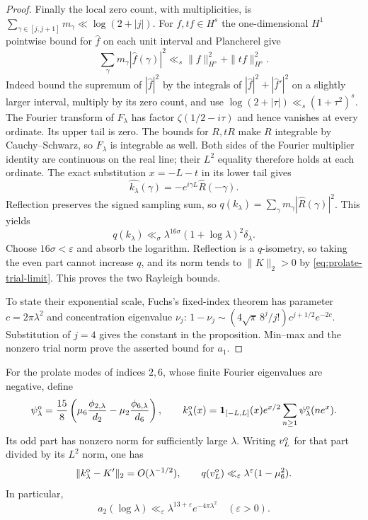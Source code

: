 \begin{proof}
Finally the local zero count, with multiplicities, is
$\sum_{\gamma\in[j,j+1]}m_\gamma\ll\log(2+|j|)$.
For $f,tf\in H^s$ the one-dimensional $H^1$ pointwise bound for
$\widehat f$ on each unit interval and Plancherel give
\[
 \sum_\gamma m_\gamma|\widehat f(\gamma)|^2
      \ll_s\|f\|_{H^s}^2+\|tf\|_{H^s}^2.
\]
Indeed bound the supremum of $|\widehat f|^2$ by the integrals of
$|\widehat f|^2+|\widehat f'|^2$ on a slightly larger interval,
multiply by its zero count, and use
$\log(2+|\tau|)\ll_s(1+\tau^2)^s$.
The Fourier transform of $F_\lambda$ has factor
$\zeta(1/2-i\tau)$ and hence vanishes at every ordinate. Its upper
tail is zero. The bounds for $R,tR$ make $R$ integrable by
Cauchy--Schwarz, so $F_\lambda$ is integrable as well. Both sides of
the Fourier multiplier identity are continuous on the real line;
their $L^2$ equality therefore holds at each ordinate.
The exact substitution $x=-L-t$ in its lower tail gives
\[
 \widehat{k_\lambda}(\gamma)
       =-e^{i\gamma L}\widehat R(-\gamma).
\]
Reflection preserves the signed sampling sum, so
$q(k_\lambda)=\sum_\gamma m_\gamma|\widehat R(\gamma)|^2$.
This yields
\[
 q(k_\lambda)\ll_\sigma
       \lambda^{16\sigma}(1+\log\lambda)^2\delta_\lambda.
\]
Choose $16\sigma<\varepsilon$ and absorb the logarithm.
Reflection is a $q$-isometry, so taking the even part cannot increase
$q$, and its norm tends to $\|K\|_2>0$ by
\eqref{eq:prolate-trial-limit}. This proves the two Rayleigh bounds.

To state their exponential scale, Fuchs's fixed-index theorem
\cite[Theorem~1, p.~319]{fuchs1964} has parameter $c=2\pi\lambda^2$
and concentration eigenvalue $\nu_j$:
$1-\nu_j\sim(4\sqrt\pi\,8^j/j!)c^{j+1/2}e^{-2c}$.
Substitution of $j=4$ gives the constant in the proposition.
Min--max and the nonzero trial norm prove the asserted bound for $a_1$.
\end{proof}

\begin{proposition}
\label{prop:odd-prolate-upper}
For the prolate modes of indices $2,6$, whose finite Fourier
eigenvalues are negative, define
\[
 \psi_\lambda^{\rm o}
   =\frac{15}{8}\left(\mu_6\frac{\phi_{2,\lambda}}{d_2}
                  -\mu_2\frac{\phi_{6,\lambda}}{d_6}\right),
 \qquad
 k_\lambda^{\rm o}(x)={\bf1}_{[-L,L]}(x)e^{x/2}
                   \sum_{n\ge1}\psi_\lambda^{\rm o}(ne^x).
\]
Its odd part has nonzero norm for sufficiently large $\lambda$.
Writing $v_L^{\rm o}$ for that part divided by its $L^2$ norm, one has
\[
 \|k_\lambda^{\rm o}-K'\|_2=O(\lambda^{-1/2}),\qquad
 q(v_L^{\rm o})\ll_\varepsilon\lambda^\varepsilon(1-\mu_6^2).
\]
In particular,
\begin{equation}
 a_2(\log\lambda)\ll_\varepsilon
                  \lambda^{13+\varepsilon}e^{-4\pi\lambda^2}
 \quad(\varepsilon>0).
 \label{eq:second-eigenvalue-upper}
\end{equation}
\end{proposition}

